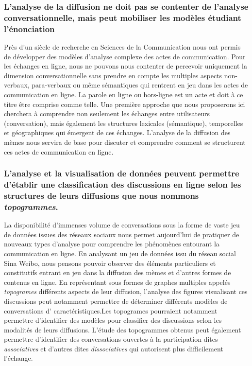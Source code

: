 \subsubsection{L'analyse de la diffusion ne doit pas se contenter de l'analyse conversationnelle, mais peut mobiliser les modèles étudiant l'énonciation} 

Près d'un siècle de recherche en Sciences de la Communication nous ont permis de développer des modèles d'analyse complexe des actes de communication. Pour les échanges en ligne, nous ne pouvons nous contenter de percevoir uniquement la dimension conversationnelle sans prendre en compte les multiples aspects non-verbaux, para-verbaux ou même sémantiques qui rentrent en jeu dans les actes de communication en ligne. La parole en ligne ou hors-ligne est un acte et doit à ce titre être comprise comme telle. Une première approche que nous proposerons ici cherchera à comprendre non seulement les échanges entre utilisateurs (conversation), mais également les structures lexicales (sémantique), temporelles et géographiques qui émergent de ces échanges. L'analyse de la diffusion des mèmes nous servira de base pour discuter et comprendre comment se structurent ces actes de communication en ligne.


\subsubsection{L'analyse et la visualisation de données peuvent permettre d'établir une classification des discussions en ligne selon les structures de leurs diffusions que nous nommons \textit{topogrammes}.}

La disponibilité d'immenses volume de conversations sous la forme de vaste jeu de données issues des réseaux sociaux nous permet aujourd'hui de pratiquer de nouveaux types d'analyse pour comprendre les phénomènes entourant la communication en ligne. En analysant un jeu de données issu du réseau social Sina Weibo, nous pensons pouvoir observer des éléments particuliers et constitutifs entrant en jeu dans la diffusion des mèmes et d'autres formes de contenus en ligne. En représentant sous formes de graphes multiples appelés \textit{topogrames} différents aspects de leur diffusion, l{\textquoteright}analyse des figures visualisant ces discussions peut notamment permettre de déterminer différents modèles de conversations d{\textquoteright} caractéristiques.Les topogrames pourraient notamment permettre d'identifier des modèles pour classifier des discussions selon les modalités de leurs diffusions. L'étude des topogrammes obtenus peut également permettre d'identifier des conversations ouvertes à la participation dites \textit{associatives }et d{\textquoteright}autres dites \textit{dissociatives} qui autorisent plus difficilement l{\textquoteright}échange. 

